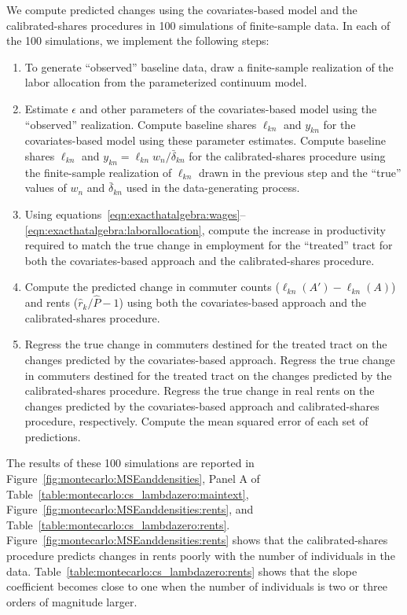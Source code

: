 \documentclass[11pt]{article}
\theoremstyle{definition}
\begin{document}
We compute predicted changes using the covariates-based model and the calibrated-shares procedures in 100 simulations of finite-sample data.
In each of the 100 simulations, we implement the following steps:
\begin{enumerate}\itemsep0em
\item 
To generate ``observed'' baseline data, draw a finite-sample realization of the labor allocation from the parameterized continuum model.
\item
Estimate $\epsilon$ and other parameters of the covariates-based model using the ``observed'' realization.
Compute baseline shares $\ell_{kn}$ and $y_{kn}$ for the covariates-based model using these parameter estimates.
Compute baseline shares $\ell_{kn}$ and $y_{kn} = \ell_{kn} w_n / \bar{\delta}_{kn}$ for the calibrated-shares procedure using the finite-sample realization of $\ell_{kn}$ drawn in the previous step and the ``true'' values of $w_n$ and $\bar{\delta}_{kn}$ used in the data-generating process.
\item
Using equations~\eqref{eqn:exacthatalgebra:wages}--\eqref{eqn:exacthatalgebra:laborallocation},
compute the increase in productivity required to match the true change in employment for the ``treated'' tract for both the covariates-based approach and the calibrated-shares procedure.
\item 
Compute the predicted change in commuter counts ($\ell_{kn}(A')-\ell_{kn}(A)$) and rents ($\hat{r}_{k}/\hat{P} - 1$) using
both the covariates-based approach and the calibrated-shares procedure.
\item
Regress the true change in commuters destined for the treated tract
on the changes predicted by the covariates-based approach.
Regress the true change in commuters destined for the treated tract
on the changes predicted by the calibrated-shares procedure.
Regress the true change in real rents on the changes predicted by
the covariates-based approach and calibrated-shares procedure, respectively.
Compute the mean squared error of each set of predictions.
\end{enumerate}

The results of these 100 simulations are reported in
Figure~\ref{fig:montecarlo:MSEanddensities}, 
Panel A of Table~\ref{table:montecarlo:cs_lambdazero:maintext},
Figure~\ref{fig:montecarlo:MSEanddensities:rents},
and 
Table~\ref{table:montecarlo:cs_lambdazero:rents}.
Figure~\ref{fig:montecarlo:MSEanddensities:rents} shows that the calibrated-shares procedure predicts changes in rents poorly with the number of individuals in the data.
Table~\ref{table:montecarlo:cs_lambdazero:rents} shows that the slope coefficient becomes close to one when the number of individuals is two or three orders of magnitude larger.
\end{document}
